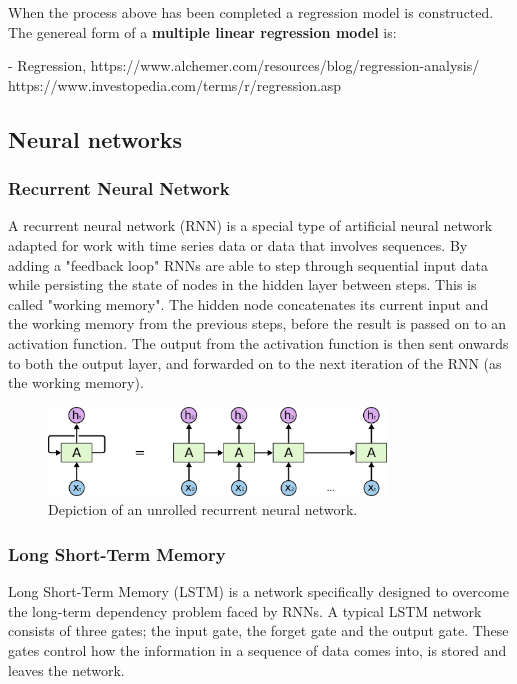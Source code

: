 When the process above has been completed a regression model is constructed. The genereal form of a \textbf{multiple linear regression model} is:  

- Regression, https://www.alchemer.com/resources/blog/regression-analysis/\\ 

https://www.investopedia.com/terms/r/regression.asp

\subsection{Neural networks}
\subsubsection{Recurrent Neural Network}
A recurrent neural network (RNN) is a special type of artificial neural network adapted for work with time series data or data that involves sequences. \parencite{saeed_2021} 
By adding a "feedback loop" RNNs are able to step through sequential input data while persisting the state of nodes in the hidden layer between steps. This is called "working memory". The hidden node concatenates its current input and the working memory from the previous steps, before the result is passed on to an activation function. The output from the activation function is then sent onwards to both the output layer, and forwarded on to the next iteration of the RNN (as the working memory).~\parencite{bouvet_2020}

\begin{figure}[H]
    \centering
    \includegraphics[width=0.8\textwidth]{data/Figures/Neural networks/RNN.png}
    \caption[Depiction of an unrolled recurrent neural network]{Depiction of an unrolled recurrent neural network.~\cite{khalajani_2023}}\label{fig:RNN}
\end{figure}

\subsubsection{Long Short-Term Memory} 
Long Short-Term Memory (LSTM) is a network specifically designed to overcome the long-term dependency problem faced by RNNs. 
A typical LSTM network consists of three gates; the input gate, the forget gate and the output gate.
These gates control how the information in a sequence of data comes into, is stored and leaves the network.  

